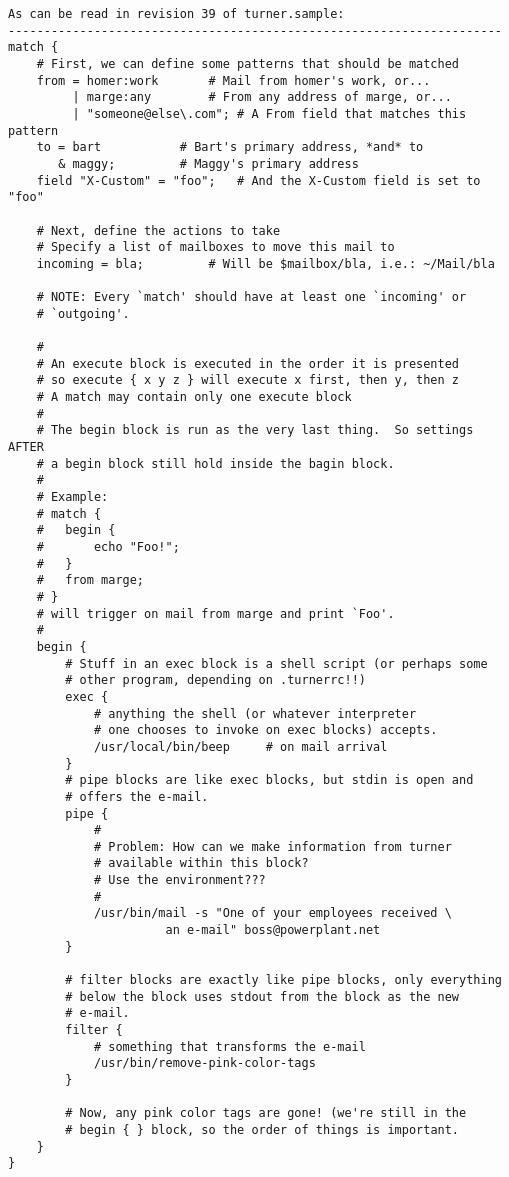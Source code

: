 \documentclass[a4paper]{article}
\begin{document}
\begin{verbatim}
As can be read in revision 39 of turner.sample:
---------------------------------------------------------------------
match {
	# First, we can define some patterns that should be matched
	from = homer:work		# Mail from homer's work, or...
	     | marge:any		# From any address of marge, or...
	     | "someone@else\.com";	# A From field that matches this pattern
	to = bart			# Bart's primary address, *and* to
	   & maggy;			# Maggy's primary address
	field "X-Custom" = "foo";	# And the X-Custom field is set to "foo"

	# Next, define the actions to take
	# Specify a list of mailboxes to move this mail to
	incoming = bla;			# Will be $mailbox/bla, i.e.: ~/Mail/bla

	# NOTE: Every `match' should have at least one `incoming' or
	# `outgoing'.

	#
	# An execute block is executed in the order it is presented
	# so execute { x y z } will execute x first, then y, then z
	# A match may contain only one execute block
	#
	# The begin block is run as the very last thing.  So settings AFTER
	# a begin block still hold inside the bagin block.
	#
	# Example:
	# match {
	#	begin {
	#		echo "Foo!";
	#	}
	#	from marge;
	# }
	# will trigger on mail from marge and print `Foo'.
	#
	begin {
		# Stuff in an exec block is a shell script (or perhaps some
		# other program, depending on .turnerrc!!)
		exec {
			# anything the shell (or whatever interpreter
			# one chooses to invoke on exec blocks) accepts.
			/usr/local/bin/beep		# on mail arrival
		}
		# pipe blocks are like exec blocks, but stdin is open and
		# offers the e-mail.
		pipe {
			#
			# Problem: How can we make information from turner
			# available within this block?
			# Use the environment???
			#
			/usr/bin/mail -s "One of your employees received \
					  an e-mail" boss@powerplant.net
		}

		# filter blocks are exactly like pipe blocks, only everything
		# below the block uses stdout from the block as the new
		# e-mail.
		filter {
			# something that transforms the e-mail
			/usr/bin/remove-pink-color-tags
		}

		# Now, any pink color tags are gone! (we're still in the
		# begin { } block, so the order of things is important.
	}
}
\end{verbatim}
\end{document}
